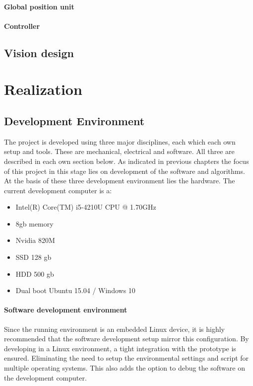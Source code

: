 \documentclass[11pt,fleqn,,a4paper,twoside,openright]{book}
\begin{document}
\subsection{Global position unit}

\subsection{Controller}

\chapter{Vision design}

\part{Realization}

\chapter{Development Environment}
The project is developed using three major disciplines, each which each own setup and tools. These are mechanical, electrical and software. All three are described in each own section below. As indicated in previous chapters  the focus of this project in this stage lies on development of the software and algorithms. \\
At the basis of these three development environment lies the hardware. The current development computer is a:
\begin{itemize}
	\item Intel(R) Core(TM) i5-4210U CPU @ 1.70GHz
	\item 8gb memory
	\item Nvidia 820M
	\item SSD 128 gb
	\item HDD 500 gb
	\item Dual boot Ubuntu 15.04 / Windows 10	
\end{itemize}

\subsection{Software development environment}
Since the running environment is an embedded Linux device, it is highly recommended that the software development setup mirror this configuration. By developing in a Linux environment, a tight integration with the prototype is ensured. Eliminating the need to setup the environmental settings and script for multiple operating systems. This also adds the option to debug the software on the development computer. 
\end{document}
